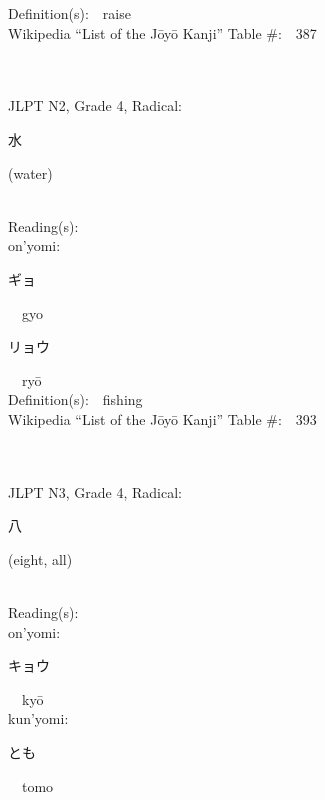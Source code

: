 \begin{multicols}{2}
Definition(s):\ \ raise \\
Wikipedia ``List of the J\=oy\=o Kanji'' Table \#:\ \ 387 \\
\ \ \\
{\fontsize{34pt}{40pt}  }\ \ \\  %
{JLPT N2, Grade 4, Radical:\ \ {\begin{CJK}{UTF8}{min} 水 \end{CJK}} (water) } \\
Reading(s):\ \ \\
{\hspace*{1em}}on'yomi:\ \ \\
{\hspace*{2em}}{\begin{CJK}{UTF8}{min} ギョ \end{CJK}}\ \ gyo\ \ \\
{\hspace*{2em}}{\begin{CJK}{UTF8}{min} リョウ \end{CJK}}\ \ ry\=o\ \ \\
Definition(s):\ \ fishing \\
Wikipedia ``List of the J\=oy\=o Kanji'' Table \#:\ \ 393 \\
\ \ \\
{\fontsize{34pt}{40pt}  }\ \ \\  %
{JLPT N3, Grade 4, Radical:\ \ {\begin{CJK}{UTF8}{min} 八 \end{CJK}} (eight, all) } \\
Reading(s):\ \ \\
{\hspace*{1em}}on'yomi:\ \ \\
{\hspace*{2em}}{\begin{CJK}{UTF8}{min} キョウ \end{CJK}}\ \ ky\=o\ \ \\
{\hspace*{1em}}kun'yomi:\ \ \\
{\hspace*{2em}}{\begin{CJK}{UTF8}{min} とも \end{CJK}}\ \ tomo\ \ \\

\end{multicols}
